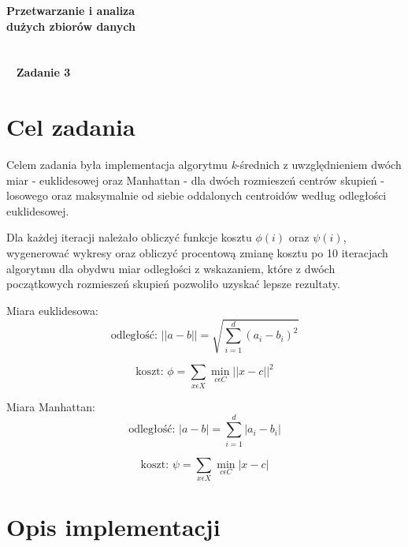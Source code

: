 \documentclass[a4paper,11pt]{article}
\begin{document}
\begin{titlepage}
\begin{center}
\textbf{\Huge{Przetwarzanie i analiza\\}}
\textbf{\Huge{dużych zbiorów danych\\~\\~\\~}}
\textbf{\Huge{Zadanie 3}}
\end{center}

\end{titlepage}

\setcounter{page}{2}

\newpage
\section{Cel zadania}

Celem zadania była implementacja algorytmu \textit{k}-średnich z uwzględnieniem dwóch miar - euklidesowej oraz Manhattan - dla dwóch rozmieszeń centrów skupień - losowego oraz maksymalnie od siebie oddalonych centroidów według odległości euklidesowej. 

Dla każdej iteracji należało obliczyć funkcje kosztu $\phi(i)$ oraz $\psi(i)$, wygenerować wykresy oraz obliczyć procentową zmianę kosztu po 10 iteracjach algorytmu dla obydwu miar odległości z wskazaniem, które z dwóch początkowych rozmieszeń skupień pozwoliło uzyskać lepsze rezultaty.

Miara euklidesowa:
\begin{equation}
    \text{odległość:  } || a - b || = \sqrt{\sum_{i=1}^{d} (a_{i} - b_{i}) ^ 2 }
\end{equation}

\begin{equation}
    \text{koszt:  } \phi = \sum_{x \epsilon X} \min_{c \epsilon C} || x - c || ^ 2
\end{equation}

Miara Manhattan:
\begin{equation}
    \text{odległość:  } | a - b | = \sum_{i=1}^{d} | a_{i} - b_{i} |
\end{equation}

\begin{equation}
    \text{koszt:  } \psi =  \sum_{x \epsilon X} \min_{c \epsilon C} | x - c |
\end{equation}


\section{Opis implementacji}
\end{document}
